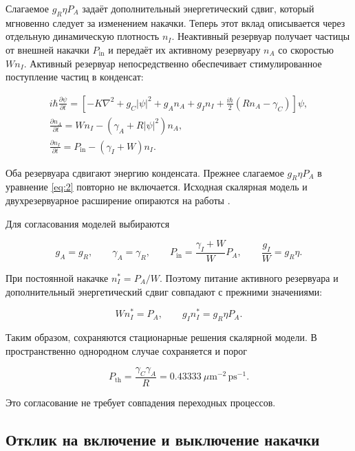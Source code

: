 \documentclass[12pt,a4paper]{article}
\begin{document}
Слагаемое \(g_R\eta P_A\) задаёт дополнительный энергетический сдвиг, который мгновенно следует за изменением накачки. Теперь этот вклад описывается через отдельную динамическую плотность \(n_I\). Неактивный резервуар получает частицы от внешней накачки \(P_{\mathrm{in}}\) и передаёт их активному резервуару \(n_A\) со скоростью \(Wn_I\). Активный резервуар непосредственно обеспечивает стимулированное поступление частиц в конденсат:

\begin{equation}\label{eq:2}
\begin{gathered}
i\hbar\frac{\partial\psi}{\partial t}
=
\left[
-K\nabla^2+g_C|\psi|^2+g_A n_A+g_I n_I
+\frac{i\hbar}{2}(Rn_A-\gamma_C)
\right]\psi,\\[0.5em]
\frac{\partial n_A}{\partial t}
=
Wn_I-(\gamma_A+R|\psi|^2)n_A,\\[0.5em]
\frac{\partial n_I}{\partial t}
=
P_{\mathrm{in}}-(\gamma_I+W)n_I.
\end{gathered}
\end{equation}

Оба резервуара сдвигают энергию конденсата. Прежнее слагаемое \(g_R\eta P_A\) в уравнение \eqref{eq:2} повторно не включается. Исходная скалярная модель и двухрезервуарное расширение опираются на работы \cite{ref1,ref2}.

Для согласования моделей выбираются

\begin{equation}\label{eq:3}
g_A=g_R,\qquad
\gamma_A=\gamma_R,\qquad
P_{\mathrm{in}}=\frac{\gamma_I+W}{W}P_A,
\qquad
\frac{g_I}{W}=g_R\eta.
\end{equation}

При постоянной накачке \(n_I^*=P_A/W\). Поэтому питание активного резервуара и дополнительный энергетический сдвиг совпадают с прежними значениями:

\[
Wn_I^*=P_A,\qquad g_I n_I^*=g_R\eta P_A.
\]

Таким образом, сохраняются стационарные решения скалярной модели. В пространственно однородном случае сохраняется и порог

\[
P_{\mathrm{th}}=\frac{\gamma_C\gamma_A}{R}
=0.43333\ \mu\mathrm m^{-2}\,\mathrm{ps}^{-1}.
\]

Это согласование не требует совпадения переходных процессов.

\subsection{Отклик на включение и выключение накачки}\label{sec:1.2}
\end{document}
